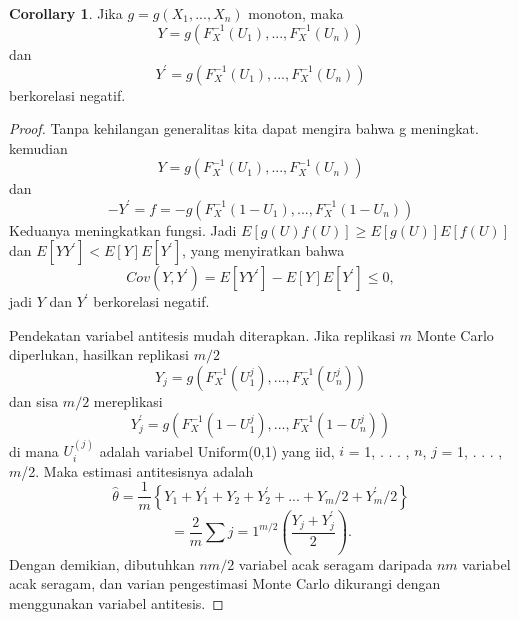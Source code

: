 \documentclass[a4paper,12pt]{article}
\theoremstyle{definition}
\newtheorem{corollary}{Corollary}[theorem]
\begin{document}
\begin{corollary}
Jika $g=g(X_{1},...,X_{n})$ monoton, maka
\begin{equation}
    Y=g(F_{X}^{-1}(U_{1}),...,F_{X}^{-1}(U_{n}))
\end{equation}
dan
\begin{equation}
    Y^{{}'}=g(F_{X}^{-1}(U_{1}),...,F_{X}^{-1}(U_{n}))
\end{equation}
berkorelasi negatif.
\label{co:c1}
\end{corollary}
\begin{proof}
    Tanpa kehilangan generalitas kita dapat mengira bahwa g meningkat. kemudian
    \begin{equation}
        Y=g(F_{X}^{-1}(U_{1}),...,F_{X}^{-1}(U_{n}))
    \end{equation}
    dan
    \begin{equation}
        -Y^{{}'}=f=-g(F_{X}^{-1}(1-U_{1}),...,F_{X}^{-1}(1-U_{n}))
    \end{equation}
    Keduanya meningkatkan fungsi. Jadi $E[g(U)f(U)]\geq E[g(U)]E[f(U)]$ dan $E[YY^{{}'}]< E[Y]E[Y^{{}'}]$, yang menyiratkan bahwa
    \begin{equation}
        Cov(Y,Y^{{}'})=E[YY^{{}'}]-E[Y]E[Y^{{}'}]\leq 0,
    \end{equation}
    jadi $Y$ dan $Y^{{}'}$ berkorelasi negatif.

    Pendekatan variabel antitesis mudah diterapkan. Jika replikasi $m$ Monte Carlo diperlukan, hasilkan replikasi $m/2$
    \begin{equation}
        Y_{j}=g(F_{X}^{-1}(U_{1}^{j}),...,F_{X}^{-1}(U_{n}^{j}))
    \end{equation}
    dan sisa $m/2$ mereplikasi
    \begin{equation}
        Y_{j}^{{}'}=g(F_{X}^{-1}(1-U_{1}^{j}),...,F_{X}^{-1}(1-U_{n}^{j}))
    \end{equation}
di mana $U_{i}^{(j)}$ adalah variabel Uniform(0,1) yang iid, $i$ = 1, . . . , $n$, $j$ = 1, . . . ,$m$/2. Maka estimasi antitesisnya adalah
\begin{equation}
    \hat{\theta}=\frac{1}{m}\left \{ Y_{1} + Y_{1}^{{}'} + Y_{2} + Y_{2}^{{}'}+...+ Y_{m}/2 + Y_{m}^{{}'}/2 \right \}
\end{equation}
\begin{equation*}
 =\frac{2}{m}\sum{j=1}^{m/2}\left ( \frac{ Y_{j} + Y_{j}^{{}'}}{2} \right ).   
\end{equation*}    
Dengan demikian, dibutuhkan $nm/2$ variabel acak seragam daripada $nm$ variabel acak seragam, dan varian pengestimasi Monte Carlo dikurangi dengan menggunakan variabel antitesis.
\end{proof}   
\end{document}
